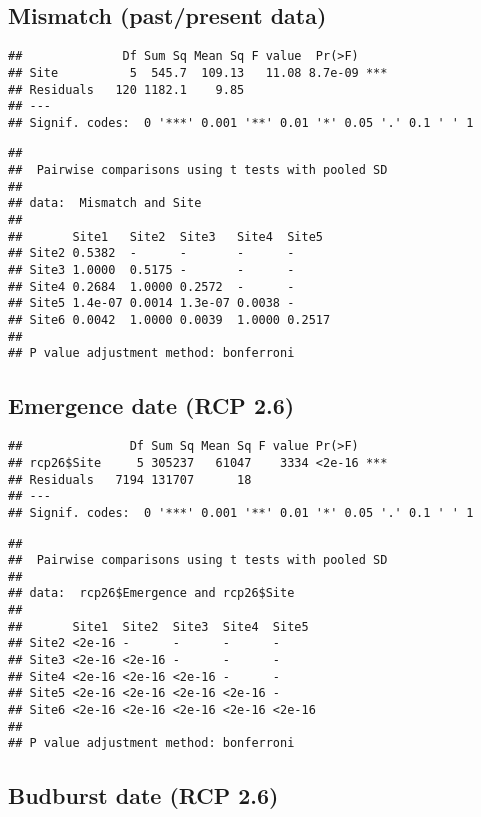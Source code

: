 \documentclass[
]{article}
\begin{document}
\hypertarget{mismatch-pastpresent-data}{%
\subsection{Mismatch (past/present
data)}\label{mismatch-pastpresent-data}}

\begin{verbatim}
##              Df Sum Sq Mean Sq F value  Pr(>F)    
## Site          5  545.7  109.13   11.08 8.7e-09 ***
## Residuals   120 1182.1    9.85                    
## ---
## Signif. codes:  0 '***' 0.001 '**' 0.01 '*' 0.05 '.' 0.1 ' ' 1
\end{verbatim}

\begin{verbatim}
## 
##  Pairwise comparisons using t tests with pooled SD 
## 
## data:  Mismatch and Site 
## 
##       Site1   Site2  Site3   Site4  Site5 
## Site2 0.5382  -      -       -      -     
## Site3 1.0000  0.5175 -       -      -     
## Site4 0.2684  1.0000 0.2572  -      -     
## Site5 1.4e-07 0.0014 1.3e-07 0.0038 -     
## Site6 0.0042  1.0000 0.0039  1.0000 0.2517
## 
## P value adjustment method: bonferroni
\end{verbatim}

\hypertarget{emergence-date-rcp-2.6}{%
\subsection{Emergence date (RCP 2.6)}\label{emergence-date-rcp-2.6}}

\begin{verbatim}
##               Df Sum Sq Mean Sq F value Pr(>F)    
## rcp26$Site     5 305237   61047    3334 <2e-16 ***
## Residuals   7194 131707      18                   
## ---
## Signif. codes:  0 '***' 0.001 '**' 0.01 '*' 0.05 '.' 0.1 ' ' 1
\end{verbatim}

\begin{verbatim}
## 
##  Pairwise comparisons using t tests with pooled SD 
## 
## data:  rcp26$Emergence and rcp26$Site 
## 
##       Site1  Site2  Site3  Site4  Site5 
## Site2 <2e-16 -      -      -      -     
## Site3 <2e-16 <2e-16 -      -      -     
## Site4 <2e-16 <2e-16 <2e-16 -      -     
## Site5 <2e-16 <2e-16 <2e-16 <2e-16 -     
## Site6 <2e-16 <2e-16 <2e-16 <2e-16 <2e-16
## 
## P value adjustment method: bonferroni
\end{verbatim}

\hypertarget{budburst-date-rcp-2.6}{%
\subsection{Budburst date (RCP 2.6)}\label{budburst-date-rcp-2.6}}
\end{document}
